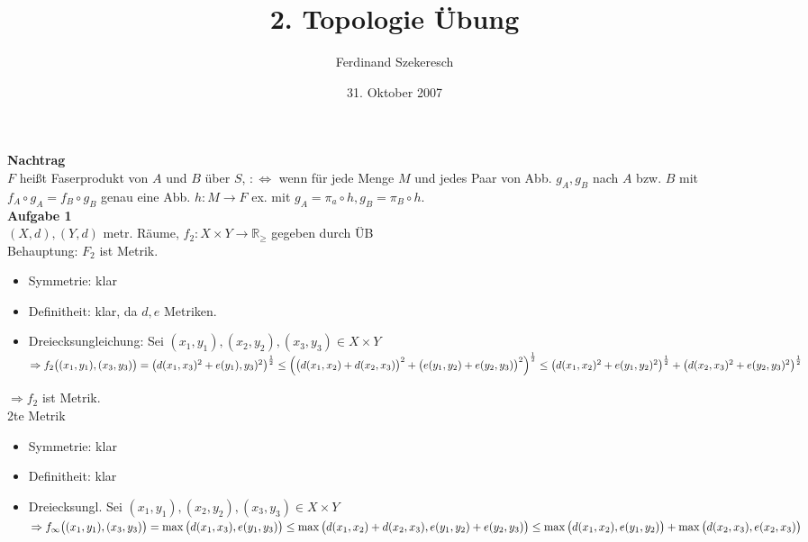 \documentclass{article}
\title{2. Topologie Übung}
\author{Ferdinand Szekeresch}
\date{31. Oktober 2007}
\begin{document}
\maketitle

\textbf{Nachtrag}\\
$F$ heißt Faserprodukt von $A$ und $B$ über $S$, $:\Leftrightarrow$ wenn für jede Menge $M$ und jedes Paar von Abb. $g_A, g_B$ nach $A$ bzw. $B$ mit $f_A\circ g_A = f_B\circ g_B$ genau eine Abb. $h: M\rightarrow F$ ex. mit $g_A = \pi_a\circ h, g_B = \pi_B \circ h$.\\

\textbf{Aufgabe 1}\\
$(X,d),(Y,d)$ metr. Räume, $f_2: X\times Y \rightarrow \mathbb{R}_\geq$ gegeben durch ÜB\\
Behauptung: $F_2$ ist Metrik.\\
\begin{itemize}
\item Symmetrie: klar
\item Definitheit: klar, da $d,e$ Metriken.
\item Dreiecksungleichung: Sei $(x_1,y_1),(x_2,y_2),(x_3,y_3) \in X\times Y$\\
$\Rightarrow f_2\big((x_1,y_1),(x_3,y_3)\big) = \big(d(x_1,x_3)^2 + e(y_1),y_3)^2\big)^\frac12\\
\leq \Big(\big(d(x_1,x_2)+d(x_2,x_3)\big)^2 + \big(e(y_1,y_2)+e(y_2,y_3)\big)^2\Big)^\frac12\\
\leq\big(d(x_1,x_2)^2 + e(y_1,y_2)^2\big)^\frac12 + \big(d(x_2,x_3)^2 + e(y_2,y_3)^2\big)^\frac12$\\
\end{itemize}
$\Rightarrow f_2$ ist Metrik.\\
2te Metrik
\begin{itemize}
\item Symmetrie: klar
\item Definitheit: klar
\item Dreiecksungl. Sei $(x_1,y_1),(x_2,y_2),(x_3,y_3) \in X\times Y$\\
$\Rightarrow f_\infty\big((x_1,y_1),(x_3,y_3)\big) = \max\big(d(x_1,x_3),e(y_1,y_3)\big)\\
\leq \max\big(d(x_1,x_2)+d(x_2,x_3), e(y_1,y_2)+e(y_2,y_3)\big)\\
\leq \max\big(d(x_1,x_2),e(y_1,y_2)\big)+ \max\big(d(x_2,x_3),e(x_2,x_3)\big)$\\
\end{itemize}
\end{document}
